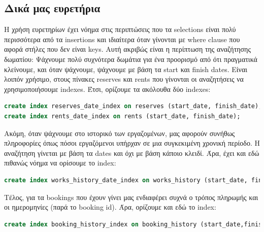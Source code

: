 \documentclass[a4paper,oneside, 11pt]{article}
\begin{document}
\subsection{Δικά μας ευρετήρια}
Η χρήση ευρετηρίων έχει νόημα στις περιπτώσεις που τα selections είναι πολύ περισσότερα από τα insertions και ιδιαίτερα όταν γίνονται με where clause που αφορά στήλες που δεν είναι keys. Αυτή ακριβώς είναι η περίπτωση της αναζήτησης δωματίου: Ψάχνουμε πολύ συχνότερα δωμάτια για ένα προορισμό από ότι πραγματικά κλείνουμε, και όταν ψάχνουμε, ψάχνουμε με βάση τα start και finish dates. Είναι λοιπόν χρήσιμο, στους πίνακες reserves και rents που γίνονται οι αναζητήσεις να χρησιμοποιήσουμε indexes. 
Έτσι, ορίζουμε τα ακόλουθα δύο indexes:
\begin{lstlisting}[language=SQL]
create index reserves_date_index on reserves (start_date, finish_date);
create index rents_date_index on rents (start_date, finish_date);
\end{lstlisting}
Ακόμη, όταν ψάχνουμε στο ιστορικό των εργαζομένων, μας αφορούν συνήθως πληροφορίες όπως πόσοι εργαζόμενοι υπήρχαν σε μια συγκεκιμένη χρονική περίοδο. Η αναζήτηση γίνεται με βάση τα dates και όχι με βάση κάποιο κλειδί. Άρα, έχει και εδώ πιθανώς νόημα να ορίσουμε το index:
\begin{lstlisting}[language=SQL]
create index works_history_date_index on works_history (start_date, finish_date);
\end{lstlisting}
Τέλος, για τα bookings που έχουν γίνει μας ενδιαφέρει συχνά ο τρόπος πληρωμής και οι ημερομηνίες (παρά το booking id). Άρα, ορίζουμε και εδώ το index:
\begin{lstlisting}[language=SQL]
create index booking_history_index on booking_history (start_date,finish_date,payment_method);
\end{lstlisting}
\end{document}
